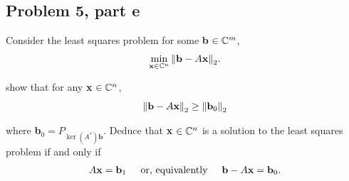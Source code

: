 \subsection{Problem 5, part e}
Consider the least squares problem for some \textbf{b} $\in \mathbb{C}^m$,
\begin{align}
    \min_{\textbf{x} \in \mathbb{C}^n}\norm{\textbf{b} - A\textbf{x}}_2. \label{p5e: lsp}
\end{align}


show that for any \textbf{x} $\in \mathbb{C}^n$, 
\[
\norm{\textbf{b} - A\textbf{x}}_2 \geq \norm{\textbf{b}_0}_2
\]

where \textbf{b}$_0 = P_{\ker (A^*) \textbf{b}}$. Deduce that \textbf{x} $\in \mathbb{C}^n$ is a solution to the least squares problem if and only if
\begin{align}
A\textbf{x} = \textbf{b}_1 \hspace{5mm} \text{or, equivalently} \hspace{5mm} \textbf{b} - A\textbf{x} = \textbf{b}_0. \label{p5e: equiv}
\end{align}

